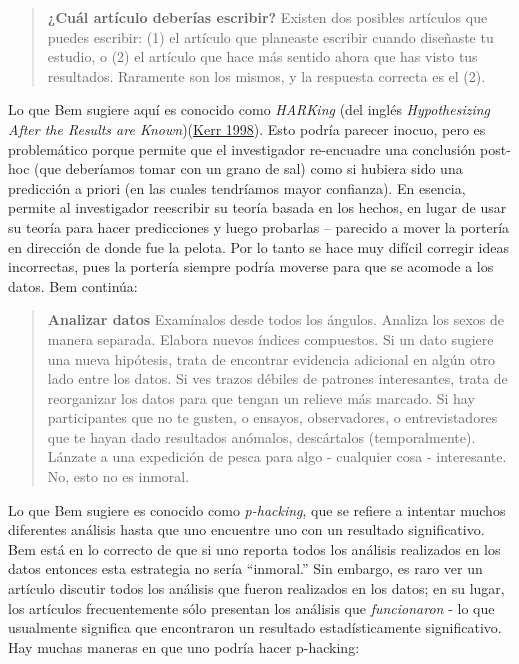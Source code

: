 \documentclass[
  12pt,
]{book}
\theoremstyle{definition}
\theoremstyle{definition}
\theoremstyle{definition}
\theoremstyle{remark}
\begin{document}
\begin{quote}
\textbf{¿Cuál artículo deberías escribir?} Existen dos posibles artículos que puedes escribir: (1) el artículo que planeaste escribir cuando diseñaste tu estudio, o (2) el artículo que hace más sentido ahora que has visto tus resultados. Raramente son los mismos, y la respuesta correcta es el (2).
\end{quote}

Lo que Bem sugiere aquí es conocido como \emph{HARKing} (del inglés \emph{Hypothesizing After the Results are Known})(\protect\hyperlink{ref-kerr:1998}{Kerr 1998}). Esto podría parecer inocuo, pero es problemático porque permite que el investigador re-encuadre una conclusión post-hoc (que deberíamos tomar con un grano de sal) como si hubiera sido una predicción a priori (en las cuales tendríamos mayor confianza). En esencia, permite al investigador reescribir su teoría basada en los hechos, en lugar de usar su teoría para hacer predicciones y luego probarlas -- parecido a mover la portería en dirección de donde fue la pelota. Por lo tanto se hace muy difícil corregir ideas incorrectas, pues la portería siempre podría moverse para que se acomode a los datos. Bem continúa:

\begin{quote}
\textbf{Analizar datos} Examínalos desde todos los ángulos. Analiza los sexos de manera separada. Elabora nuevos índices compuestos. Si un dato sugiere una nueva hipótesis, trata de encontrar evidencia adicional en algún otro lado entre los datos. Si ves trazos débiles de patrones interesantes, trata de reorganizar los datos para que tengan un relieve más marcado. Si hay participantes que no te gusten, o ensayos, observadores, o entrevistadores que te hayan dado resultados anómalos, descártalos (temporalmente). Lánzate a una expedición de pesca para algo - cualquier cosa - interesante. No, esto no es inmoral.
\end{quote}

Lo que Bem sugiere es conocido como \emph{p-hacking}, que se refiere a intentar muchos diferentes análisis hasta que uno encuentre uno con un resultado significativo. Bem está en lo correcto de que si uno reporta todos los análisis realizados en los datos entonces esta estrategia no sería ``inmoral.'' Sin embargo, es raro ver un artículo discutir todos los análisis que fueron realizados en los datos; en su lugar, los artículos frecuentemente sólo presentan los análisis que \emph{funcionaron} - lo que usualmente significa que encontraron un resultado estadísticamente significativo. Hay muchas maneras en que uno podría hacer p-hacking:
\end{document}
